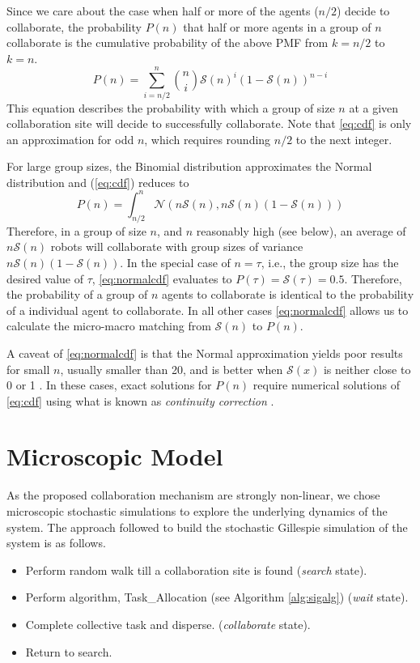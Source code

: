 \documentclass{TeXstyles/DARS/svmult}  %
\newcommand{\sig}{\mathcal{S}}
\begin{document}
Since we care about the case when half or more of the agents ($n/2$) decide to collaborate, the probability $P(n)$ that half or more agents in a group of $n$ collaborate is the cumulative probability of the above PMF from $k = {n/2}$ to $k = n$. 
\begin{equation}
	P(n) = \sum\limits_{i={n/2}}^{n}\binom{n}{i}\sig(n)^{i}\left(1 - \sig(n)\right)^{n - i}\label{eq:cdf}
\end{equation}
This equation describes the probability with which a group of size $n$ at a given collaboration site will decide to successfully collaborate.  Note that \eqref{eq:cdf} is only an approximation for odd $n$, which requires rounding $n/2$ to the next integer. 

For large group sizes, the Binomial distribution approximates the Normal distribution and (\ref{eq:cdf}) reduces to 
\begin{equation}
P(n)=\int_{n/2}^{n} \mathcal{N}(n\sig(n),n\sig(n)(1-\sig(n)))\label{eq:normalcdf}
\end{equation}
Therefore, in a group of size $n$, and $n$ reasonably high (see below), an average of $n\sig(n)$ robots will collaborate with group sizes of variance $n\sig(n)(1-\sig(n))$. In the special case of $n=\tau$, i.e., the group size has the desired value of $\tau$, \eqref{eq:normalcdf} evaluates to $P(\tau) = \sig(\tau)=0.5$. Therefore, the probability of a group of $n$ agents to collaborate is identical to the probability of a individual agent to collaborate. In all other cases \eqref{eq:normalcdf} allows us to calculate the micro-macro matching from $\sig(n)$ to $P(n)$.  

A caveat of \eqref{eq:normalcdf} is that the Normal approximation yields poor results for small $n$, usually smaller than 20, and is better when $\sig(x)$ is neither close to 0 or 1 \cite{box78}. In these cases, exact solutions for $P(n)$ require numerical solutions of \eqref{eq:cdf} using what is known as \emph{continuity correction} \cite{Feller1945}.




\section{Microscopic Model}\label{sec:micromodel}
As the proposed collaboration mechanism are strongly non-linear, we chose microscopic stochastic simulations to explore the underlying dynamics of the system. The approach followed to build the stochastic Gillespie simulation of the system is as follows.
\begin{itemize}
\item Perform random walk till a collaboration site is found (\emph{search} state).
\item Perform algorithm, Task\_Allocation (see Algorithm \ref{alg:sigalg}) (\emph{wait} state).
\item Complete collective task and disperse. (\emph{collaborate} state).
\item Return to search.
\end{itemize}
\end{document}
